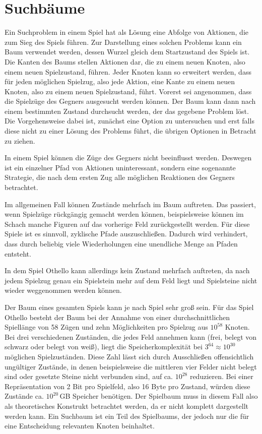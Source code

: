 \section{Suchbäume}
\label{sec:gametree}


Ein Suchproblem in einem Spiel hat als Lösung eine Abfolge von Aktionen, die zum Sieg des Spiels führen. Zur Darstellung
eines solchen Problems kann ein Baum verwendet werden, dessen Wurzel gleich dem Startzustand des Spiels ist. Die Kanten
des Baums stellen Aktionen dar, die zu einem neuen Knoten, also einem neuen Spielzustand, führen. Jeder Knoten kann so
erweitert werden, dass für jeden möglichen Spielzug, also jede Aktion, eine Kante zu einem neuen Knoten, also zu einem
neuen Spielzustand, führt. Vorerst sei angenommen, dass die Spielzüge des Gegners ausgesucht werden können. Der Baum
kann dann nach einem bestimmten Zustand durchsucht werden, der das gegebene Problem löst. Die Vorgehensweise dabei ist,
zunächst eine Option zu untersuchen und erst falls diese nicht zu einer Lösung des Problems führt, die übrigen Optionen
in Betracht zu ziehen.
\cite[S.~75]{ai2010russel}

In einem Spiel können die Züge des Gegners nicht beeinflusst werden. Deswegen ist ein einzelner Pfad von Aktionen
uninteressant, sondern eine sogenannte Strategie, die nach dem ersten Zug alle möglichen Reaktionen des Gegners
betrachtet.
\cite[S.~163]{ai2010russel}

Im allgemeinen Fall können Zustände mehrfach im Baum auftreten. Das passiert, wenn Spielzüge rückgängig gemacht werden
können, beispielsweise können im Schach manche Figuren auf das vorherige Feld zurückgestellt werden. Für diese Spiele
ist es sinnvoll, zyklische Pfade auszuschließen. %
Dadurch wird verhindert, dass durch beliebig
viele Wiederholungen eine unendliche Menge an Pfaden entsteht.
\cite[S.~75]{ai2010russel}

In dem Spiel Othello kann allerdings kein Zustand mehrfach auftreten, da nach jedem Spielzug genau ein Spielstein mehr
auf dem Feld liegt und Spielsteine nicht wieder weggenommen werden können.

Der Baum eines gesamten Spiels kann je nach Spiel sehr groß sein. Für das Spiel Othello besteht der Baum bei der Annahme
von einer durchschnittlichen Spiellänge von 58 Zügen und zehn Möglichkeiten pro Spielzug aus $10^{58}$ Knoten. Bei drei
verschiedenen Zuständen, die jedes Feld annehmen kann (frei, belegt von schwarz oder belegt von weiß), liegt die
Speicherkomplexität bei $3^{64}\approx10^{30}$ möglichen Spielzuständen. Diese Zahl lässt sich durch Ausschließen
offensichtlich ungültiger Zustände, in denen beispielsweise die mittleren vier Felder nicht belegt sind oder gesetzte
Steine nicht verbunden sind, auf ca. $10^{28}$ reduzieren.
\cite[S.~167]{searchingforsolutions}
Bei einer Repräsentation von 2 Bit pro Spielfeld, also 16 Byte pro Zustand, würden diese Zustände ca. $10^{20}$\,GB
Speicher benötigen. Der Spielbaum muss in diesem Fall also als theoretisches Konstrukt betrachtet werden, da er nicht
komplett dargestellt werden kann. Ein Suchbaum ist ein Teil des Spielbaums, der jedoch nur die für eine Entscheidung
relevanten Knoten beinhaltet.
\cite[S.~162f.]{ai2010russel}
